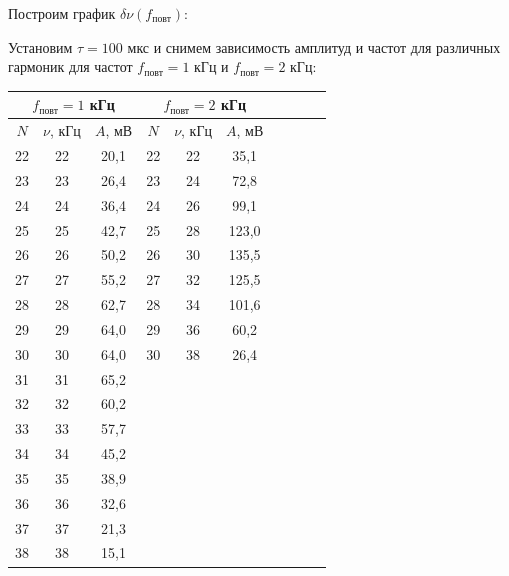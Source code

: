 \documentclass[14pt]{article}
\begin{document}
Построим график $\delta\nu(f_{\text{повт}})$:


\vspace{1cm}
Установим $\tau = 100$ мкс и снимем зависимость амплитуд и частот для различных гармоник для частот $f_{\text{повт}} = 1$ кГц и $f_{\text{повт}} = 2$ кГц:

\vspace{1cm}
\begin{center}
\begin{tabular}{|c|c|c|c|c|c|c|c|c|c|}
\hline
\multicolumn{3}{|c|}{$f_{\text{повт}} = 1$ кГц}&\multicolumn{3}{|c|}{$f_{\text{повт}} = 2$ кГц}\\
\hline
$N$&$\nu$, кГц&$A$, мВ&$N$&$\nu$, кГц&$A$, мВ\\
\hline
22&22&20,1&22&22&35,1\\
\hline
23&23&26,4&23&24&72,8\\
\hline
24&24&36,4&24&26&99,1\\
\hline
25&25&42,7&25&28&123,0\\
\hline
26&26&50,2&26&30&135,5\\
\hline
27&27&55,2&27&32&125,5\\
\hline
28&28&62,7&28&34&101,6\\
\hline
29&29&64,0&29&36&60,2\\
\hline
30&30&64,0&30&38&26,4\\
\hline
31&31&65,2&&&\\
\hline
32&32&60,2&&&\\
\hline
33&33&57,7&&&\\
\hline
34&34&45,2&&&\\
\hline
35&35&38,9&&&\\
\hline
36&36&32,6&&&\\
\hline
37&37&21,3&&&\\
\hline
38&38&15,1&&&\\
\hline
\end{tabular}
\end{center}
\end{document}
